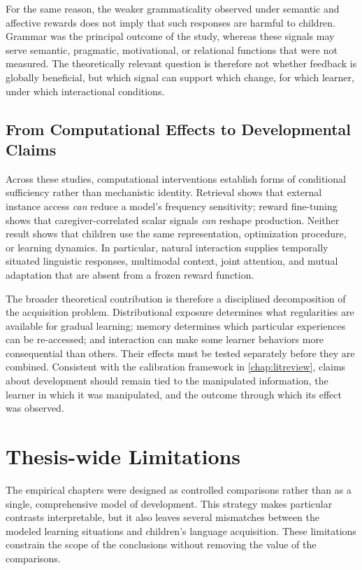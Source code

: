 For the same reason, the weaker grammaticality observed under semantic and affective rewards does not imply that such responses are harmful to children. Grammar was the principal outcome of the study, whereas these signals may serve semantic, pragmatic, motivational, or relational functions that were not measured. The theoretically relevant question is therefore not whether feedback is globally beneficial, but which signal can support which change, for which learner, under which interactional conditions.

\subsection{From Computational Effects to Developmental Claims}

Across these studies, computational interventions establish forms of conditional sufficiency rather than mechanistic identity. Retrieval shows that external instance access \emph{can} reduce a model's frequency sensitivity; reward fine-tuning shows that caregiver-correlated scalar signals \emph{can} reshape production. Neither result shows that children use the same representation, optimization procedure, or learning dynamics. In particular, natural interaction supplies temporally situated linguistic responses, multimodal context, joint attention, and mutual adaptation that are absent from a frozen reward function.

The broader theoretical contribution is therefore a disciplined decomposition of the acquisition problem. Distributional exposure determines what regularities are available for gradual learning; memory determines which particular experiences can be re-accessed; and interaction can make some learner behaviors more consequential than others. Their effects must be tested separately before they are combined. Consistent with the calibration framework in \cref{chap:litreview}, claims about development should remain tied to the manipulated information, the learner in which it was manipulated, and the outcome through which its effect was observed.

\section{Thesis-wide Limitations}
\label{sec:gd_limitations}

The empirical chapters were designed as controlled comparisons rather than as a single, comprehensive model of development. This strategy makes particular contrasts interpretable, but it also leaves several mismatches between the modeled learning situations and children's language acquisition. These limitations constrain the scope of the conclusions without removing the value of the comparisons.

